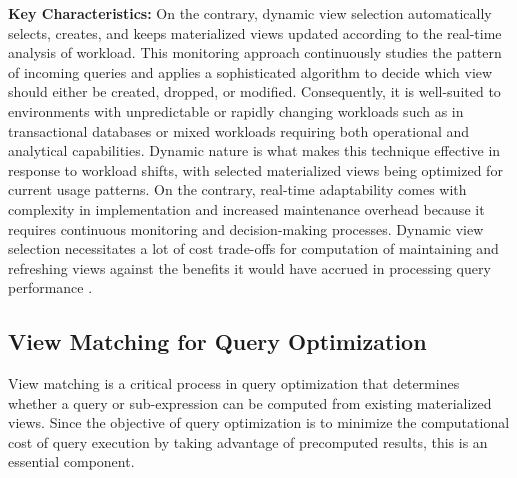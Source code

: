 \begin{enumerate}
    \textbf{Key Characteristics:} On the contrary, dynamic view selection automatically selects, creates, and keeps materialized views updated according to the real-time analysis of workload. This monitoring approach continuously studies the pattern of incoming queries and applies a sophisticated algorithm to decide which view should either be created, dropped, or modified. Consequently, it is well-suited to environments with unpredictable or rapidly changing workloads such as in transactional databases or mixed workloads requiring both operational and analytical capabilities. Dynamic nature is what makes this technique effective in response to workload shifts, with selected materialized views being optimized for current usage patterns. On the contrary, real-time adaptability comes with complexity in implementation and increased maintenance overhead because it requires continuous monitoring and decision-making processes. Dynamic view selection necessitates a lot of cost trade-offs for computation of maintaining and refreshing views against the benefits it would have accrued in processing query performance \cite{lohman2000selftuning,mamoulis2012survey,gupta2002selftuning}.
\end{enumerate}


\subsection{View Matching for Query Optimization }

View matching is a critical process in query optimization that determines whether a query or sub-expression can be computed from existing materialized views. Since the objective of query optimization is to minimize the computational cost of query execution by taking advantage of precomputed results, this is an essential component.\vspace{.4cm}

